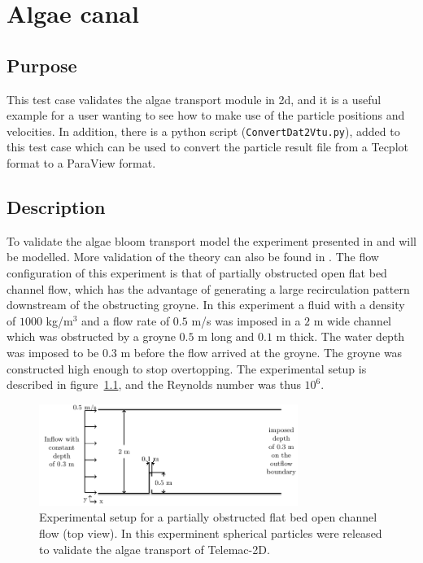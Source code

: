 \chapter{Algae canal}
%


\section{Purpose}

This test case validates the algae transport module in \telemac2d, and it is a useful example for a user
wanting to see how to make use of the particle positions and velocities. In addition, there is a python
script (\texttt{ConvertDat2Vtu.py}), added to this test case which can be used to convert the particle
result file from a Tecplot format to a ParaView format.

\section{Description}

To validate the algae bloom transport model the experiment presented in \citet{Joly_these} and \citet{Joly_jhr}
will be modelled. More validation of the theory can also be found in \citet{Joly_pof}. The flow configuration
of this experiment is that of partially obstructed open flat bed channel flow, which has the advantage of
generating a large recirculation pattern downstream of the obstructing groyne. In this experiment a fluid with
a density of $1000$ kg/m$^{3}$ and a flow rate of $0.5$ m/s was imposed in a $2$ m wide channel which was
obstructed by a groyne $0.5$ m long and $0.1$ m thick. The water depth was imposed to be $0.3$ m before the flow
arrived at the groyne. The groyne was constructed high enough to stop overtopping. The experimental setup is
described in figure~\ref{fig:exp_setup}, and the Reynolds number was thus $10^{6}$.

\begin{figure}[hb]%
\begin{center}
%
  \includegraphics[width=0.75\textwidth]{./Figures/CanalAlgExpSetup}
%
\end{center}
\caption{Experimental setup for a partially obstructed flat bed open channel flow (top view). In this experminent
spherical particles were released to validate the algae transport of Telemac-2D.}
\label{fig:exp_setup}
\end{figure}

